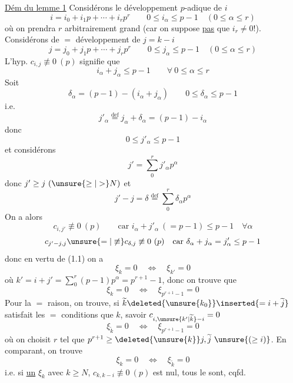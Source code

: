 \uline{Dém du lemme 1} Considérons le développement $p$-adique de $i$
\[
i=i_0+i_1p+\cdots+i_rp^r\qquad0\leq i_\alpha\leq p-1\quad(0\leq\alpha\leq r)
\]
où on prendra $r$ arbitrairement grand (car on suppose  \uline{pas} que $i_r\ne0$!). Considérons de $=$  développement de $j=k-i$
\[
j=j_0+j_1p+\cdots+j_rp^r\qquad0\leq j_\alpha\leq p-1\quad(0\leq\alpha\leq r)
\]
L'hyp. $c_{i,j}\not\equiv0\ (p)$ signifie que
\[
i_\alpha+j_\alpha\leq p-1\qquad\forall\ 0\leq\alpha\leq r
\]
Soit \deleted{$\unsure{\varepsilon_\alpha}$}
\[
\delta_\alpha=(p-1)-(i_\alpha+j_\alpha)\qquad0\leq\delta_\alpha\leq p-1
\]
i.e.
\[
j'_\alpha\overset{\mathrm{def}}=j_\alpha+\delta_\alpha=(p-1)-i_\alpha
\]
donc
\[
0\leq j'_\alpha\leq p-1
\]
et considérons
\[
j'=\sum_0^r j'_\alpha p^\alpha
\]
donc $j'\geq j\ (\unsure{\geq|>}N)$ et
\[
j'-j=\delta\overset{\mathrm{def}}=\sum_0^r\delta_\alpha p^\alpha
\]
On a alors 
\[
c_{i,j'}\not\equiv0\ (p)\qquad\text{car }i_\alpha+j'_\alpha\ (=p-1)\leq p-1\quad\forall\alpha
\]
\[
c_{j'-j,j}\unsure{=|\not\equiv}c_{\delta,j}\not\equiv0\ (p)\quad\text{car }\delta_\alpha+j_\alpha=j'_\alpha\leq p-1
\]
donc en vertu de (1.1) on a
\[
\xi_k=0\quad\Longleftrightarrow\quad\xi_{k'}=0
\]
où $k'=i+j'=\sum_0^r(p-1)p^\alpha=p^{r+1}-1$,
donc on trouve que
\[
\xi_k=0\quad\Longleftrightarrow\quad\xi_{p^{r+1}-1}=0
\]
Pour la $=$ raison, on trouve, si $\widetilde k\deleted{\unsure{k_0}}\inserted{=i+\widetilde j}$ satisfait les $=$ conditions que $k$, savoir $c_{i,\unsure{k'|\widetilde k}-i}=0$
\[
\xi_{\widetilde k}=0\quad\Longleftrightarrow\quad\xi_{p^{r+1}-1}=0
\]
où on choisit $r$ tel que $p^{r+1}\geq\deleted{\unsure{k}}j,\widetilde j\ \unsure{(\geq i)}$.
En comparant, on trouve
\[
\xi_k=0\quad\Longleftrightarrow\quad\xi_{\widetilde k}=0
\]
i.e. si \uline{un} $\xi_k$ avec $k\geq N$, $c_{k,k-i}\not\equiv0\ (p)$ est nul, tous le sont, cqfd.

